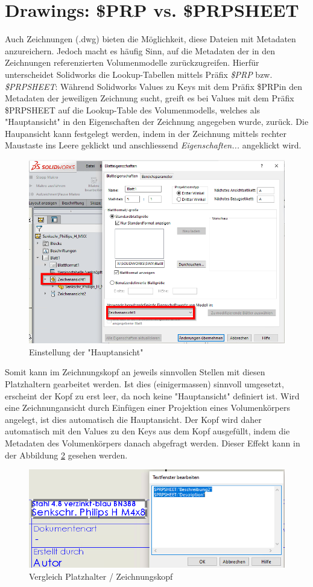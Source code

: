\documentclass[12pt,a4paper]{article}
\begin{document}
	\section{Drawings: \$PRP vs. \$PRPSHEET}
	Auch Zeichnungen (.dwg) bieten die Möglichkeit, diese Dateien mit Metadaten anzureichern. Jedoch macht es häufig Sinn, auf die Metadaten der in den Zeichnungen referenzierten Volumenmodelle zurückzugreifen. Hierfür unterscheidet Solidworks die Lookup-Tabellen mittels Präfix \textit{\$PRP} bzw. \textit{\$PRPSHEET}: Während Solidworks Values zu Keys mit dem Präfix \$PRPin den Metadaten der jeweiligen Zeichnung sucht, greift es bei Values mit dem Präfix \$PRPSHEET auf die Lookup-Table des Volumenmodells, welches als "Hauptansicht" in den Eigenschaften der Zeichnung angegeben wurde, zurück. Die Haupansicht kann festgelegt werden, indem in der Zeichnung mittels rechter Maustaste ins Leere geklickt und anschliessend \textit{Eigenschaften...} angeklickt wird.
	\begin{figure}[H]
		\centering
		\includegraphics[width=.5\linewidth]{310123_CAD_PDM/screenshot008}
		\caption{Einstellung der "Hauptansicht"}
		\label{fig:screenshot008}
	\end{figure}\noindent
	Somit kann im Zeichnungskopf an jeweils sinnvollen Stellen mit diesen Platzhaltern gearbeitet werden. Ist dies (einigermassen) sinnvoll umgesetzt, erscheint der Kopf zu erst leer, da noch keine "Hauptansicht" definiert ist. Wird eine Zeichnungansicht durch Einfügen einer Projektion eines Volumenkörpers angelegt, ist dies automatisch die Hauptansicht. Der Kopf wird daher automatisch mit den Values zu den Keys aus dem Kopf ausgefüllt, indem die Metadaten des Volumenkörpers danach abgefragt werden. Dieser Effekt kann in der Abbildung \ref{fig:screenshot009} gesehen werden.
	\begin{figure}[H]
		\centering
		\includegraphics[width=1\linewidth]{310123_CAD_PDM/screenshot009}
		\caption{Vergleich Platzhalter / Zeichnungskopf}
		\label{fig:screenshot009}
	\end{figure}
	
\end{document}
